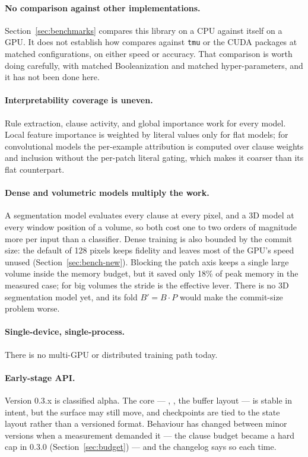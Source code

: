 \paragraph{No comparison against other implementations.}
Section~\ref{sec:benchmarks} compares this library on a CPU against itself on a GPU. It does
not establish how \ttlibname compares against \texttt{tmu} or the CUDA packages at matched
configurations, on either speed or accuracy. That comparison is worth doing carefully, with
matched Booleanization and matched hyper-parameters, and it has not been done here.

\paragraph{Interpretability coverage is uneven.}
Rule extraction, clause activity, and global importance work for every model. Local
feature importance is weighted by literal values only for flat models; for convolutional
models the per-example attribution is computed over clause weights and inclusion without the
per-patch literal gating, which makes it coarser than its flat counterpart.

\paragraph{Dense and volumetric models multiply the work.}
A segmentation model evaluates every clause at every pixel, and a 3D model at every window
position of a volume, so both cost one to two orders of magnitude more per input than a
classifier. Dense training is also bounded by the commit size: the default of 128 pixels
keeps fidelity and leaves most of the GPU's speed unused (Section~\ref{sec:bench-new}).
Blocking the patch axis keeps a single large volume inside the memory budget, but it saved
only 18\% of peak memory in the measured case; for big volumes the stride is the effective
lever. There is no 3D segmentation model yet, and its fold $B' = B\cdot P$ would make the
commit-size problem worse.

\paragraph{Single-device, single-process.}
There is no multi-GPU or distributed training path today.

\paragraph{Early-stage API.}
Version 0.3.x is classified alpha. The core --- , , the buffer
layout --- is stable in intent, but the surface may still move, and checkpoints are tied to
the state layout rather than a versioned format. Behaviour has changed between minor
versions when a measurement demanded it --- the clause budget became a hard cap in 0.3.0
(Section~\ref{sec:budget}) --- and the changelog says so each time.

